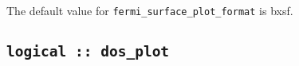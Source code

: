 The default value for \verb#fermi_surface_plot_format# is bxsf.


%




%
%
%
%
%
%
%
%
%
%
%
%




\subsection[dos\_plot]{\tt logical :: dos\_plot}

